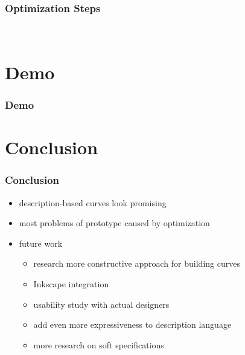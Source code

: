 \documentclass[mathserif]{beamer}
\begin{document}
		\begin{frame}
			\frametitle{Optimization Steps}
			\\
		\end{frame}

	\section{Demo}


		\begin{frame}
			\frametitle{Demo}
		\end{frame}

	\section{Conclusion}

		\begin{frame}
			\frametitle{Conclusion}
			\begin{itemize}
				\item description-based curves look promising
				\item most problems of prototype caused by optimization
				\item future work
				\begin{itemize}
					\item research more constructive approach for building curves
					\item Inkscape integration
					\item usability study with actual designers
					\item add even more expressiveness to description language
					\item more research on soft specifications
				\end{itemize}
			\end{itemize}
		\end{frame}
\end{document}
